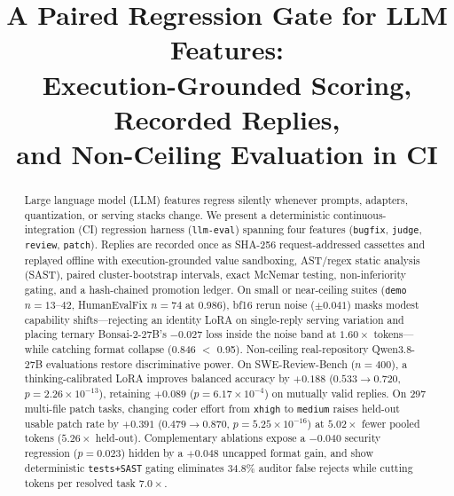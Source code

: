 \documentclass[conference]{IEEEtran}
\begin{document}
\title{A Paired Regression Gate for LLM Features:\\ Execution-Grounded Scoring, Recorded Replies,\\ and Non-Ceiling Evaluation in CI}

\author{
}

\maketitle

\begin{abstract}
Large language model (LLM) features regress silently whenever prompts, adapters, quantization, or serving stacks change. We present a deterministic continuous-integration (CI) regression harness (\texttt{llm-eval}) spanning four features (\texttt{bugfix}, \texttt{judge}, \texttt{review}, \texttt{patch}). Replies are recorded once as SHA-256 request-addressed cassettes and replayed offline with execution-grounded value sandboxing, AST/regex static analysis (SAST), paired cluster-bootstrap intervals, exact McNemar testing, non-inferiority gating, and a hash-chained promotion ledger. On small or near-ceiling suites (\texttt{demo} $n=13\text{--}42$, HumanEvalFix $n=74$ at 0.986), bf16 rerun noise ($\pm 0.041$) masks modest capability shifts---rejecting an identity LoRA on single-reply serving variation and placing ternary Bonsai-2-27B's $-$0.027 loss inside the noise band at $1.60\times$ tokens---while catching format collapse (0.846 $<$ 0.95). Non-ceiling real-repository Qwen3.8-27B evaluations restore discriminative power. On SWE-Review-Bench ($n=400$), a thinking-calibrated LoRA improves balanced accuracy by $+0.188$ ($0.533 \to 0.720$, $p=2.26\times 10^{-13}$), retaining $+0.089$ ($p=6.17\times 10^{-4}$) on mutually valid replies. On 297 multi-file patch tasks, changing coder effort from \texttt{xhigh} to \texttt{medium} raises held-out usable patch rate by $+0.391$ ($0.479 \to 0.870$, $p=5.25\times 10^{-16}$) at $5.02\times$ fewer pooled tokens ($5.26\times$ held-out). Complementary ablations expose a $-0.040$ security regression ($p=0.023$) hidden by a $+0.048$ uncapped format gain, and show deterministic \texttt{tests+SAST} gating eliminates 34.8\% auditor false rejects while cutting tokens per resolved task $7.0\times$.
\end{abstract}
\end{document}
